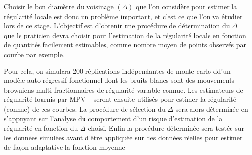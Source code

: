 Choisir le bon diamètre du voisinage $(\Delta)$ que l'on considère pour estimer la régularité locale est donc un problème important, et c'est ce que l'on va étudier lors de ce stage. L'objectif est d'obtenir une procédure de détermination du $\Delta$ que le praticien devra choisir pour l'estimation de la régularité locale en fonction de quantités facilement estimables, comme nombre moyen de points observés par courbe par exemple.

Pour cela, on simulera 200 réplications indépendantes de monte-carlo dd'un modèle auto-régressif fonctionnel dont les bruits blancs sont des mouvements browniens multi-fractionnaires de régularité variable connue. Les estimateurs de régularité fournis par MPV ~\cite{maissoro-SmoothnessFTSweakDep} seront ensuite utilisés pour estimer la régularité (connue) de ces courbes. La procédure de sélection du $\Delta$ sera alors déterminée en s'appuyant sur l'analyse du comportement d'un risque d'estimation de la régularité en fonction du $\Delta$ choisi. Enfin la procédure déterminée sera testée sur les données simulées avant d'être appliquée sur des données réelles pour estimer de façon adaptative la fonction moyenne.
